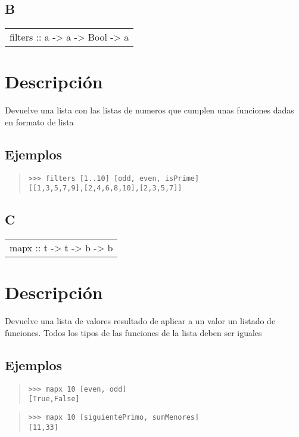 \subsection{B}
\begin{haddockdesc}
\item[\begin{tabular}{@{}l}
filters :: {\char 91}a{\char 93} -> {\char 91}a -> Bool{\char 93} -> {\char 91}{\char 91}a{\char 93}{\char 93}
\end{tabular}]
{\haddockbegindoc
\section*{Descripción}
Devuelve una lista con las listas de numeros que cumplen unas funciones dadas en formato de lista\par
\subsection*{Ejemplos}
\begin{quote}
{\haddockverb\begin{verbatim}
>>> filters [1..10] [odd, even, isPrime]
[[1,3,5,7,9],[2,4,6,8,10],[2,3,5,7]]

\end{verbatim}}
\end{quote}}
\end{haddockdesc}
\subsection{C}
\begin{haddockdesc}
\item[\begin{tabular}{@{}l}
mapx :: t -> {\char 91}t -> b{\char 93} -> {\char 91}b{\char 93}
\end{tabular}]
{\haddockbegindoc
\section*{Descripción}
Devuelve una lista de valores resultado de aplicar a un valor un listado de funciones. Todos los tipos de las funciones de la lista deben ser iguales\par
\subsection*{Ejemplos}
\begin{quote}
{\haddockverb\begin{verbatim}
>>> mapx 10 [even, odd]
[True,False]

\end{verbatim}}
\end{quote}
\begin{quote}
{\haddockverb\begin{verbatim}
>>> mapx 10 [siguientePrimo, sumMenores]
[11,33]

\end{verbatim}}
\end{quote}}
\end{haddockdesc}